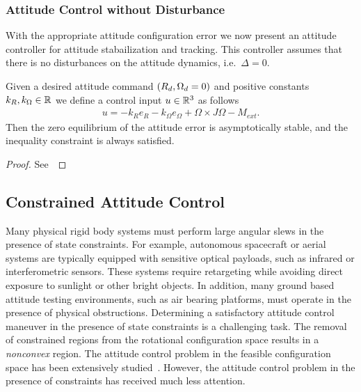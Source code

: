 \subsubsection{Attitude Control without Disturbance}
With the appropriate attitude configuration error we now present an attitude controller for attitude stabailization and tracking. 
This controller assumes that there is no disturbances on the attitude dynamics, i.e.\ \( \Delta = 0 \).
\begin{prop}\label{prop:att_control}
	Given a desired attitude command \( \left( R_d, \Omega_d = 0 \right) \) and positive constants \( k_R, k_\Omega \in \mathbb{R} \) we define a control input \( u \in \mathbb{R}^3 \) as follows
	\begin{gather}
        u = -k_R e_R - k_\Omega e_\Omega + \Omega \times J \Omega - M_{ext}. \label{eqn:nodist_control}
	\end{gather}
	Then the zero equilibrium of the attitude error is asymptotically stable, and the inequality constraint is always satisfied.
\end{prop}
\begin{proof}
See~
\end{proof}

\subsection{Constrained Attitude Control}

Many physical rigid body systems must perform large angular slews in the presence of state constraints.
For example, autonomous spacecraft or aerial systems are typically equipped with sensitive optical payloads, such as infrared or interferometric sensors.
These systems require retargeting while avoiding direct exposure to sunlight or other bright objects.
In addition, many ground based attitude testing environments, such as air bearing platforms, must operate in the presence of physical obstructions.
Determining a satisfactory attitude control maneuver in the presence of state constraints is a challenging task.
The removal of constrained regions from the rotational configuration space results in a \textit{nonconvex} region.
The attitude control problem in the feasible configuration space has been extensively studied~\cite{bullo2004,MayTeePaCC11,LEEITAC15}.
However, the attitude control problem in the presence of constraints has received much less attention.

